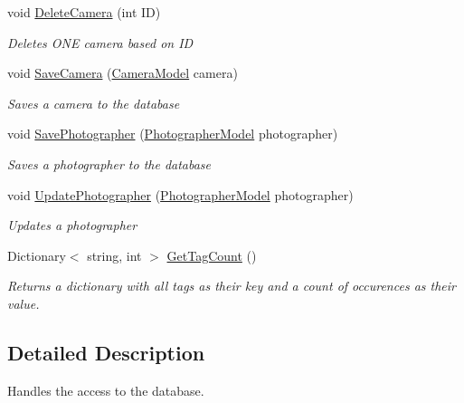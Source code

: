 \begin{DoxyCompactItemize}
void \mbox{\hyperlink{class_pic_d_b_1_1_layers_1_1_data_access_layer_aae4b79abc6acf09649d528b31b1e3f17}{Delete\+Camera}} (int ID)
\begin{DoxyCompactList}\small\item\em Deletes O\+NE camera based on ID \end{DoxyCompactList}\item 
void \mbox{\hyperlink{class_pic_d_b_1_1_layers_1_1_data_access_layer_af7dbcbd6f4ef0058b7b33a052eca4c06}{Save\+Camera}} (\mbox{\hyperlink{class_pic_d_b_1_1_models_1_1_camera_model}{Camera\+Model}} camera)
\begin{DoxyCompactList}\small\item\em Saves a camera to the database \end{DoxyCompactList}\item 
void \mbox{\hyperlink{class_pic_d_b_1_1_layers_1_1_data_access_layer_a6b4baf032a0dc297b35f28ab2455b8f5}{Save\+Photographer}} (\mbox{\hyperlink{class_pic_d_b_1_1_models_1_1_photographer_model}{Photographer\+Model}} photographer)
\begin{DoxyCompactList}\small\item\em Saves a photographer to the database \end{DoxyCompactList}\item 
void \mbox{\hyperlink{class_pic_d_b_1_1_layers_1_1_data_access_layer_a6ec13a97382256d357823c17f40bcf65}{Update\+Photographer}} (\mbox{\hyperlink{class_pic_d_b_1_1_models_1_1_photographer_model}{Photographer\+Model}} photographer)
\begin{DoxyCompactList}\small\item\em Updates a photographer \end{DoxyCompactList}\item 
Dictionary$<$ string, int $>$ \mbox{\hyperlink{class_pic_d_b_1_1_layers_1_1_data_access_layer_aa66634d35385c5d84a28352d859833bc}{Get\+Tag\+Count}} ()
\begin{DoxyCompactList}\small\item\em Returns a dictionary with all tags as their key and a count of occurences as their value. \end{DoxyCompactList}\end{DoxyCompactItemize}


\subsection{Detailed Description}
Handles the access to the database. 



